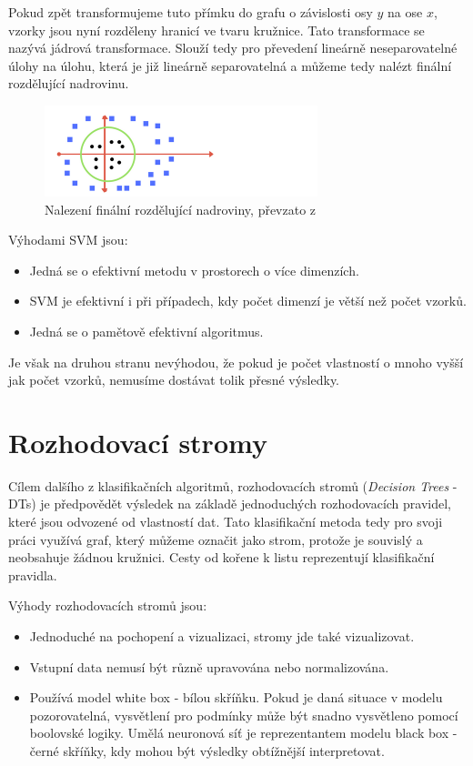 Pokud zpět transformujeme tuto přímku do grafu o závislosti osy $y$ na ose $x$, vzorky jsou nyní rozděleny hranicí ve tvaru kružnice. Tato transformace se nazývá jádrová transformace. Slouží tedy pro převedení lineárně neseparovatelné úlohy na úlohu, která je již lineárně separovatelná a můžeme tedy nalézt finální rozdělující nadrovinu. \cite{MediumSVM}

\begin{figure}[!htbp]
    \centering
    \includegraphics[width=300px]{obrazky-figures/mediumsvm3.png}
    \caption{Nalezení finální rozdělující nadroviny, převzato z \cite{MediumSVM}}
\end{figure}

Výhodami SVM jsou: \cite{ScikitSVM}
\begin{itemize}
    \item Jedná se o efektivní metodu v prostorech o více dimenzích.
    \item SVM je efektivní i při případech, kdy počet dimenzí je větší než počet vzorků.
    \item Jedná se o pamětově efektivní algoritmus.
\end{itemize}

Je však na druhou stranu nevýhodou, že pokud je počet vlastností o mnoho vyšší jak počet vzorků, nemusíme dostávat tolik přesné výsledky. 

\section{Rozhodovací stromy}
Cílem dalšího z klasifikačních algoritmů, rozhodovacích stromů (\textit{Decision Trees} - DTs) je předpovědět výsledek na základě jednoduchých rozhodovacích pravidel, které jsou odvozené od vlastností dat. Tato klasifikační metoda tedy pro svoji práci využívá graf, který můžeme označit jako strom, protože je souvislý a neobsahuje žádnou kružnici. Cesty od kořene k listu reprezentují klasifikační pravidla. 

Výhody rozhodovacích stromů jsou: \cite{ScikitDTs}
\begin{itemize}
    \item Jednoduché na pochopení a vizualizaci, stromy jde také vizualizovat.
    \item Vstupní data nemusí být různě upravována nebo normalizována.
    \item Používá model white box - bílou skříňku. Pokud je daná situace v modelu pozorovatelná, vysvětlení pro podmínky může být snadno vysvětleno pomocí boolovské logiky. Umělá neuronová síť je reprezentantem modelu black box - černé skříňky, kdy mohou být výsledky obtížnější interpretovat. 
\end{itemize}


